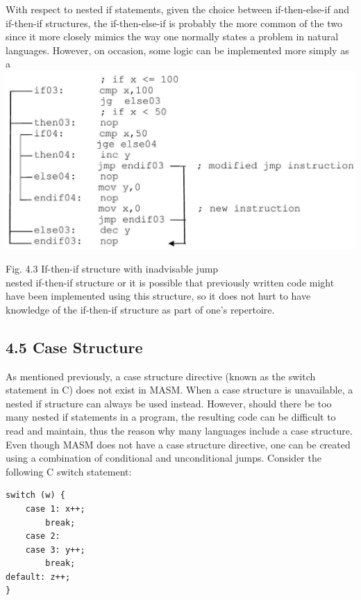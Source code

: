 \documentclass[10pt]{article}
\begin{document}
With respect to nested if statements, given the choice between if-then-else-if and if-then-if structures, the if-then-else-if is probably the more common of the two since it more closely mimics the way one normally states a problem in natural languages. However, on occasion, some logic can be implemented more simply as a\\
\includegraphics[max width=\textwidth, center]{2025_03_24_ebe50cc223a6fbc49eecg-073}

Fig. 4.3 If-then-if structure with inadvisable jump\\
nested if-then-if structure or it is possible that previously written code might have been implemented using this structure, so it does not hurt to have knowledge of the if-then-if structure as part of one's repertoire.

\subsection*{4.5 Case Structure}
As mentioned previously, a case structure directive (known as the switch statement in C) does not exist in MASM. When a case structure is unavailable, a nested if structure can always be used instead. However, should there be too many nested if statements in a program, the resulting code can be difficult to read and maintain, thus the reason why many languages include a case structure. Even though MASM does not have a case structure directive, one can be created using a combination of conditional and unconditional jumps. Consider the following C switch statement:

\begin{verbatim}
switch (w) {
    case 1: x++;
        break;
    case 2:
    case 3: y++;
        break;
default: z++;
}
\end{verbatim}
\end{document}
